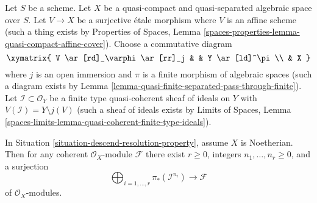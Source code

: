 \begin{situation}
\label{situation-descend-resolution-property}
Let $S$ be a scheme. Let $X$ be a quasi-compact and quasi-separated
algebraic space over $S$. Let $V \to X$ be a surjective \'etale
morphism where $V$ is an affine scheme (such a thing exists by
Properties of Spaces, Lemma
\ref{spaces-properties-lemma-quasi-compact-affine-cover}).
Choose a commutative diagram
$$
\xymatrix{
V \ar[rd]_\varphi \ar[rr]_j & & Y \ar[ld]^\pi \\
& X
}
$$
where $j$ is an open immersion and $\pi$ is a finite morphism
of algebraic spaces (such a diagram exists by
Lemma \ref{lemma-quasi-finite-separated-pass-through-finite}).
Let $\mathcal{I} \subset \mathcal{O}_Y$ be a finite type
quasi-coherent sheaf of ideals on $Y$ with
$V(\mathcal{I}) = Y \setminus j(V)$ (such a sheaf of ideals exists
by Limits of Spaces, Lemma
\ref{spaces-limits-lemma-quasi-coherent-finite-type-ideals}).
\end{situation}

\begin{lemma}
\label{lemma-surjection-in-Noetherian-case}
In Situation \ref{situation-descend-resolution-property}, assume
$X$ is Noetherian. Then for any coherent $\mathcal{O}_X$-module
$\mathcal{F}$ there exist $r \geq 0$,
integers $n_1, \ldots, n_r \geq 0$, and a surjection
$$
\bigoplus\nolimits_{i = 1, \ldots, r} \pi_*(\mathcal{I}^{n_i})
\longrightarrow \mathcal{F}
$$
of $\mathcal{O}_X$-modules.
\end{lemma}

